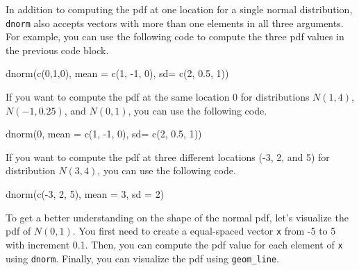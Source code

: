 \documentclass[
]{book}
\newenvironment{Shaded}{\begin{snugshade}}{\end{snugshade}}
\newcommand{\AttributeTok}[1]{\textcolor[rgb]{0.77,0.63,0.00}{#1}}
\newcommand{\DecValTok}[1]{\textcolor[rgb]{0.00,0.00,0.81}{#1}}
\newcommand{\FloatTok}[1]{\textcolor[rgb]{0.00,0.00,0.81}{#1}}
\newcommand{\FunctionTok}[1]{\textcolor[rgb]{0.00,0.00,0.00}{#1}}
\newcommand{\NormalTok}[1]{#1}
\newcommand{\SpecialCharTok}[1]{\textcolor[rgb]{0.00,0.00,0.00}{#1}}
\begin{document}
In addition to computing the pdf at one location for a single normal distribution, \texttt{dnorm} also accepts vectors with more than one elements in all three arguments. For example, you can use the following code to compute the three pdf values in the previous code block.

\begin{Shaded}
\begin{Highlighting}[]
\FunctionTok{dnorm}\NormalTok{(}\FunctionTok{c}\NormalTok{(}\DecValTok{0}\NormalTok{,}\DecValTok{1}\NormalTok{,}\DecValTok{0}\NormalTok{), }\AttributeTok{mean =} \FunctionTok{c}\NormalTok{(}\DecValTok{1}\NormalTok{, }\SpecialCharTok{{-}}\DecValTok{1}\NormalTok{, }\DecValTok{0}\NormalTok{), }\AttributeTok{sd=} \FunctionTok{c}\NormalTok{(}\DecValTok{2}\NormalTok{, }\FloatTok{0.5}\NormalTok{, }\DecValTok{1}\NormalTok{))}
\end{Highlighting}
\end{Shaded}

If you want to compute the pdf at the same location 0 for distributions \(N(1,4)\), \(N(-1, 0.25)\), and \(N(0, 1)\), you can use the following code.

\begin{Shaded}
\begin{Highlighting}[]
\FunctionTok{dnorm}\NormalTok{(}\DecValTok{0}\NormalTok{, }\AttributeTok{mean =} \FunctionTok{c}\NormalTok{(}\DecValTok{1}\NormalTok{, }\SpecialCharTok{{-}}\DecValTok{1}\NormalTok{, }\DecValTok{0}\NormalTok{), }\AttributeTok{sd=} \FunctionTok{c}\NormalTok{(}\DecValTok{2}\NormalTok{, }\FloatTok{0.5}\NormalTok{, }\DecValTok{1}\NormalTok{))}
\end{Highlighting}
\end{Shaded}

If you want to compute the pdf at three different locations (-3, 2, and 5) for distribution \(N(3, 4)\), you can use the following code.

\begin{Shaded}
\begin{Highlighting}[]
\FunctionTok{dnorm}\NormalTok{(}\FunctionTok{c}\NormalTok{(}\SpecialCharTok{{-}}\DecValTok{3}\NormalTok{, }\DecValTok{2}\NormalTok{, }\DecValTok{5}\NormalTok{), }\AttributeTok{mean =} \DecValTok{3}\NormalTok{, }\AttributeTok{sd =} \DecValTok{2}\NormalTok{)}
\end{Highlighting}
\end{Shaded}

To get a better understanding on the shape of the normal pdf, let's visualize the pdf of \(N(0,1)\). You first need to create a equal-spaced vector \texttt{x} from -5 to 5 with increment 0.1. Then, you can compute the pdf value for each element of \texttt{x} using \texttt{dnorm}. Finally, you can visualize the pdf using \texttt{geom\_line}.
\end{document}
